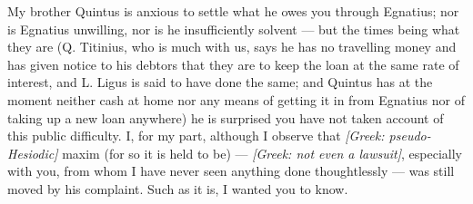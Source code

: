  My brother Quintus is anxious to settle what he owes you through Egnatius; nor is Egnatius unwilling, nor is he insufficiently solvent --- but the times being what they are (Q. Titinius, who is much with us, says he has no travelling money and has given notice to his debtors that they are to keep the loan at the same rate of interest, and L. Ligus is said to have done the same; and Quintus has at the moment neither cash at home nor any means of getting it in from Egnatius nor of taking up a new loan anywhere) he is surprised you have not taken account of this public difficulty. I, for my part, although I observe that \textit{[Greek: pseudo-Hesiodic]} maxim (for so it is held to be) --- \textit{[Greek: not even a lawsuit]}, especially with you, from whom I have never seen anything done thoughtlessly --- was still moved by his complaint. Such as it is, I wanted you to know.
